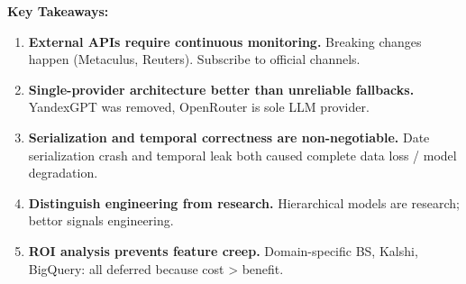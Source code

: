 \noindent
\textbf{Key Takeaways:}
\begin{enumerate}
\item \textbf{External APIs require continuous monitoring.} Breaking changes happen (Metaculus, Reuters). Subscribe to official channels.
\item \textbf{Single-provider architecture better than unreliable fallbacks.} YandexGPT was removed, OpenRouter is sole LLM provider.
\item \textbf{Serialization and temporal correctness are non-negotiable.} Date serialization crash and temporal leak both caused complete data loss / model degradation.
\item \textbf{Distinguish engineering from research.} Hierarchical models are research; bettor signals engineering.
\item \textbf{ROI analysis prevents feature creep.} Domain-specific BS, Kalshi, BigQuery: all deferred because cost > benefit.
\end{enumerate}
